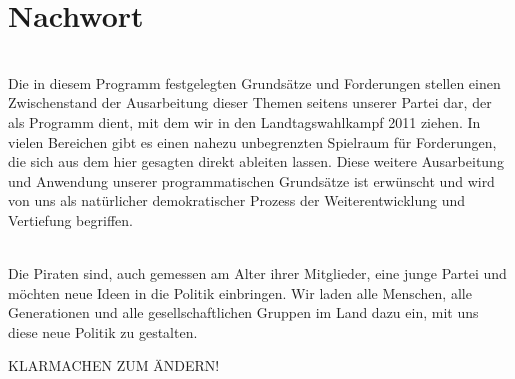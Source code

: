 \section{Nachwort}
\label{nachwort:unglow}
\\
Die in diesem Programm festgelegten Grundsätze und Forderungen stellen einen Zwischenstand der Ausarbeitung dieser Themen seitens unserer Partei dar, der als Programm dient, mit dem wir in den Landtagswahlkampf 2011 ziehen. In vielen Bereichen gibt es einen nahezu unbegrenzten Spielraum für Forderungen, die sich aus dem hier gesagten direkt ableiten lassen. Diese weitere Ausarbeitung und Anwendung unserer programmatischen Grundsätze ist erwünscht und wird von uns als natürlicher demokratischer Prozess der Weiterentwicklung und Vertiefung begriffen.

\label{nachwort:trier}
\\
Die Piraten sind, auch gemessen am Alter ihrer Mitglieder, eine junge Partei und möchten neue Ideen in die Politik einbringen. Wir laden alle Menschen, alle Generationen und alle gesellschaftlichen Gruppen im Land dazu ein, mit uns diese neue Politik zu gestalten.

KLARMACHEN ZUM ÄNDERN!
